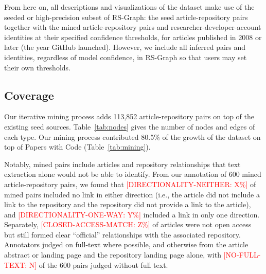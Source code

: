\documentclass[pdflatex,sn-nature]{sn-jnl}%
\begin{document}
From here on, all descriptions and visualizations of the dataset make use of the seeded or high-precision subset of RS-Graph: the seed article-repository pairs together with the mined article-repository pairs and researcher-developer-account identities at their specified confidence thresholds, for articles published in 2008 or later (the year GitHub launched). However, we include all inferred pairs and identities, regardless of model confidence, in RS-Graph so that users may set their own thresholds.

\subsection{Coverage}\label{subsec:coverage}

Our iterative mining process adds 113,852 article-repository pairs on top of the existing seed sources. Table~\ref{tab:nodes} gives the number of nodes and edges of each type. Our mining process contributed 80.5\% of the growth of the dataset on top of Papers with Code (Table~\ref{tab:mining}).

Notably, mined pairs include articles and repository relationships that text extraction alone would not be able to identify. From our annotation of 600 mined article-repository pairs, we found that \textcolor{red}{[DIRECTIONALITY-NEITHER: X\%]} of mined pairs included no link in either direction (i.e., the article did not include a link to the repository and the repository did not provide a link to the article), and \textcolor{red}{[DIRECTIONALITY-ONE-WAY: Y\%]} included a link in only one direction. Separately, \textcolor{red}{[CLOSED-ACCESS-MATCH: Z\%]} of articles were not open access but still formed clear ``official'' relationships with the associated repository. Annotators judged on full-text where possible, and otherwise from the article abstract or landing page and the repository landing page alone, with \textcolor{red}{[NO-FULL-TEXT: N]} of the 600 pairs judged without full text.
\end{document}
